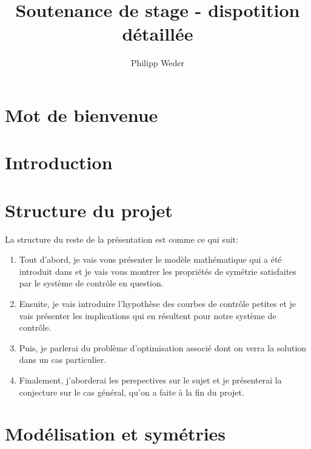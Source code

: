 \documentclass[10pt,a4paper]{article}
\author{Philipp Weder}
\title{Soutenance de stage - dispotition détaillée}
\theoremstyle{plain}
\theoremstyle{plain}
\theoremstyle{plain}
\theoremstyle{definition}
\theoremstyle{definition}
\theoremstyle{definition}
\theoremstyle{plain}
\begin{document}
\renewcommand\labelitemi{--}
\linespread{1.05}
\maketitle
\section{Mot de bienvenue}

\section{Introduction}


\section{Structure du projet}
La structure du reste de la présentation est comme ce qui suit:
\begin{enumerate}
\item Tout d'abord, je vais vous présenter le modèle mathématique qui a été introduit dans \cite{Alouges2013} et je vais vous montrer les propriétés de symétrie satisfaites par le système de contrôle en question.

\item Ensuite, je vais introduire l'hypothèse des courbes de contrôle petites et je vais présenter les implications qui en résultent pour notre système de contrôle. 

\item Puis, je parlerai du problème d'optimisation associé dont on verra la solution dans un cas particulier.

\item Finalement, j'aborderai les perspectives sur le sujet et je présenterai la conjecture sur le cas général, qu'on a faite à la fin du projet.
\end{enumerate}


\section{Modélisation et symétries}
\end{document}
